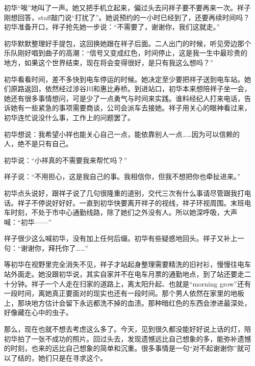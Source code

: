 \documentclass{article}
\begin{document}
初华“唉”地叫了一声。她又把手机立起来，偏过头去问祥子要不要再来一次。祥子刚想回答，staff敲门说“打扰了”。她说预约的一小时已经到了，还要再续时间吗？初华准备开口，祥子抢先她一步说：“不需要了，谢谢你，我们这就走。”



初华默默整理好手提包，这回换她跟在祥子后面。二人出门的时候，听见旁边那个乐队刚好唱到曲子的高潮：“信号又变成红色，时间停止，这是我一生中最珍贵的地方，如果这个世界结束，现在将会变得很好，是只有我这么想吗？”



初华看看时间，差不多快到电车停运的时候。她决定至少要把祥子送到电车站。她们原路返回，依然经过涉谷川和惠比寿桥。到进站口，初华本来想陪祥子坐一会，她还有很多事情想问，可是少了一点勇气与时间来实践。谁料经纪人打来电话，告诉她有一些紧急的事项需要商谈，公司会派车去接她。祥子用关心的眼神看过来，初华连忙说没什么事，工作上的问题罢了。



初华想说：我希望小祥也能关心自己一点，能依靠别人一点……因为可以信赖的人，绝不是只有自己。



初华说：“小祥真的不需要我来帮忙吗？”



祥子说：“不用担心，这是我自己的事。我相信你，但我不想把你也牵扯进来。”



初华点头说好，跟祥子说了几句很隆重的道别，交代三次有什么事请尽管跟我打电话。祥子不停说好好好。一直到初华快要离开祥子的视线，祥子环视周围。末班电车时刻，不处于市中心通勤线路，除了她们之外没有人。所以她深呼吸，大声喊：“初华——”



祥子很少这么喊初华，没有加上任何后缀。初华有些疑惑地回头。祥子又补上一句：“谢谢你，拜托你了……”



等初华在视野里完全消失不见，祥子才站起身整理需要精洗的旧衬衫，慢慢往电车站外面走。她没跟初华说，其实自家并不在电车月票的通勤地点，到了站还要走二十分钟。祥子一个人走在归家的道路上，离太阳升起、也就是“morning grow”还有一段时间，离她真正要面对的现实也还有一段时间。那个男人依然在家里的地板上，那块地方估计会留下永远都洗不掉的血渍。那种暗红色的东西会渗进最深处，好像藏在心中的虫子。



那么，现在也就不想去考虑这么多了。今天，见到很久都没能好好说上话的灯，陪初华拍了一张不成功的照片。回过头去，发现遗憾远比自己想象的多，能弥补遗憾的时刻，也来的远比自己想象的简单和沉重。很多事情是一句“对不起谢谢你”就可以了结的，她们只是在寻求这个。
\end{document}
